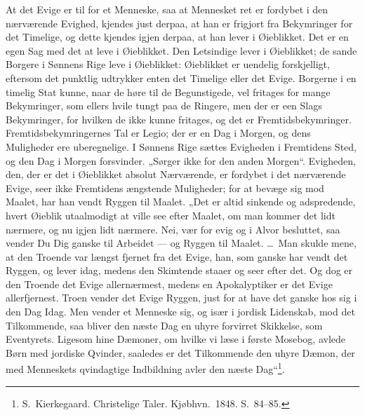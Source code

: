 \documentclass[12pt]{book}
\begin{document}
At det Evige er til for et Menneske, saa at Mennesket ret er
fordybet i den nærværende Evighed, kjendes just derpaa, at han er
frigjort fra Bekymringer for det Timelige, og dette kjendes igjen
derpaa, at han lever i Øieblikket. Det er en egen Sag med det at
leve i Øieblikket. Den Letsindige lever i Øieblikket; de sande
Borgere i Sønnens Rige leve i Øieblikket: Øieblikket er uendelig
forskjelligt, eftersom det punktlig udtrykker enten det Timelige
eller det Evige. Borgerne i en timelig Stat kunne, naar de høre til
de Begunstigede, vel fritages for mange Bekymringer, som ellers
hvile tungt paa de Ringere, men der er een Slags Bekymringer, for
hvilken de ikke kunne fritages, og det er Fremtidsbekymringer.
Fremtidsbekymringernes Tal er Legio; der er en Dag i Morgen, og dens
Muligheder ere uberegnelige. I Sønnens Rige sættes Evigheden i
Fremtidens Sted, og den Dag i Morgen forsvinder. „Sørger ikke for
den anden Morgen“. Evigheden, den, der er det i Øieblikket absolut
Nærværende, er fordybet i det nærværende Evige, seer ikke Fremtidens
ængstende Muligheder; for at bevæge sig mod Maalet,
har han vendt Ryggen til Maalet. „Det er altid sinkende og
adspredende, hvert Øieblik utaalmodigt at ville see efter Maalet, om
man kommer det lidt nærmere, og nu igjen lidt nærmere. Nei, vær for
evig og i Alvor besluttet, saa vender Du Dig ganske til Arbeidet ---
og Ryggen til Maalet. \dots\ Man skulde mene, at den Troende var
længst fjernet fra det Evige, han, som ganske har vendt det Ryggen,
og lever idag, medens den Skimtende staaer og seer efter det. Og dog
er den Troende det Evige allernærmest, medens en Apokalyptiker er
det Evige allerfjernest. Troen vender det Evige Ryggen, just for at
have det ganske hos sig i den Dag Idag. Men vender et Menneske sig,
og især i jordisk Lidenskab, mod det Tilkommende, saa bliver den
næste Dag en uhyre forvirret Skikkelse, som Eventyrets. Ligesom hine
Dæmoner, om hvilke vi læse i første Mosebog, avlede Børn med jordiske
Qvinder, saaledes er det Tilkommende den uhyre Dæmon, der med
Menneskets qvindagtige Indbildning avler den næste
Dag“\footnote{S.\ Kierkegaard. Christelige Taler. Kjøbhvn.\ 1848.
S.\ 84--85.}.
\end{document}
